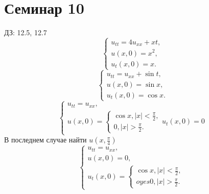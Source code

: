 \documentclass[11pt]{article}
\def\zall{\setcounter{lem}{0}\setcounter{cnsqnc}{0}\setcounter{th}{0}\setcounter{Cmt}{0}\setcounter{equation}{0}}
\newcounter{lem}\setcounter{lem}{0}
\newcounter{th}\setcounter{th}{0}
\newcounter{cnsqnc}\setcounter{cnsqnc}{0}
\newcounter{Cmt}\setcounter{Cmt}{0}
\begin{document}
\section{Семинар 10}
\label{sec:orgf6fe3ee}
\zall
ДЗ: 12.5, 12.7
\begin{equation}
\begin{cases}
u_{tt} = 4u_{xx} + xt, \\
u(x, 0) = x^2, \\
u_t(x, 0) = x.
\end{cases}
\end{equation}
\begin{equation}
\begin{cases}
u_{tt} = u_{xx} + \sin t, \\
u(x, 0) = \sin x, \\
u_t(x, 0) = \cos x.
\end{cases}
\end{equation}
\begin{equation}
\begin{cases}
u_{tt} = u_{xx}, \\
u(x, 0) = \begin{cases}
\cos x, |x| < \frac{\pi}2, \\
0, |x| > \frac{\pi}2.
\end{cases}
u_t(x, 0) = 0
\end{cases}
\end{equation}
В последнем случае найти $u\left(x, \frac{\pi}4\right)$
\begin{equation}
\begin{cases}
u_{tt} = u_{xx}, \\
u(x, 0) = 0, \\
u_t(x, 0) = \begin{cases}
\cos x, |x| < \frac{\pi}2, \\
oyes0, |x| > \frac{\pi}2.
\end{cases}
\end{cases}
\end{equation}
\end{document}
